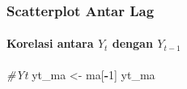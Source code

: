 \documentclass[
]{article}
\newenvironment{Shaded}{\begin{snugshade}}{\end{snugshade}}
\newcommand{\CommentTok}[1]{\textcolor[rgb]{0.56,0.35,0.01}{\textit{#1}}}
\newcommand{\DecValTok}[1]{\textcolor[rgb]{0.00,0.00,0.81}{#1}}
\newcommand{\NormalTok}[1]{#1}
\newcommand{\OtherTok}[1]{\textcolor[rgb]{0.56,0.35,0.01}{#1}}
\newcommand{\SpecialCharTok}[1]{\textcolor[rgb]{0.81,0.36,0.00}{\textbf{#1}}}
\begin{document}
\subsubsection{Scatterplot Antar Lag}\label{scatterplot-antar-lag}

\paragraph{\texorpdfstring{Korelasi antara \(Y_t\) dengan
\(Y_{t-1}\)}{Korelasi antara Y\_t dengan Y\_\{t-1\}}}\label{korelasi-antara-y_t-dengan-y_t-1}

\begin{Shaded}
\begin{Highlighting}[]
\CommentTok{\#Yt}
\NormalTok{yt\_ma }\OtherTok{\textless{}{-}}\NormalTok{ ma[}\SpecialCharTok{{-}}\DecValTok{1}\NormalTok{]}
\NormalTok{yt\_ma}
\end{Highlighting}
\end{Shaded}
\end{document}
